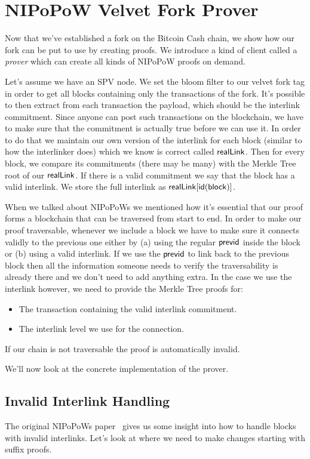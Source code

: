 \chapter{NIPoPoW Velvet Fork Prover}
Now that we've established a fork on the Bitcoin Cash chain, we show how our fork can be put to use by creating proofs. We introduce a kind of client called a \emph{prover} which can create all kinds of NIPoPoW proofs on demand.

Let's assume we have an SPV node. We set the bloom filter to our velvet fork tag in order to get all blocks containing only the transactions of the fork. It's possible to then extract from each transaction the payload, which should be the interlink commitment. Since anyone can post such transactions on the blockchain, we have to make sure that the commitment is actually true before we can use it. In order to do that we maintain our own version of the interlink for each block (similar to how the interlinker does) which we know is correct called $\sf realLink$. Then for every block, we compare its commitments (there may be many) with the Merkle Tree root of our $\sf realLink$. If there is a valid commitment we say that the block has a valid interlink. We store the full interlink as $\sf realLink[id(block)]$.

When we talked about NIPoPoWs we mentioned how it's essential that our proof forms a blockchain that can be traversed from start to end. In order to make our proof traversable, whenever we include a block we have to make sure it connects validly to the previous one either by (a) using the regular $\sf previd$ inside the block or (b) using a valid interlink. If we use the $\sf previd$ to link back to the previous block then all the information someone needs to verify the traversability is already there and we don't need to add anything extra. In the case we use the interlink however, we need to provide the Merkle Tree proofs for:

\begin{itemize}
  \item The transaction containing the valid interlink commitment.
  \item The interlink level we use for the connection.
\end{itemize}

If our chain is not traversable the proof is automatically invalid.

We'll now look at the concrete implementation of the prover.

\section{Invalid Interlink Handling}
The original NIPoPoWs paper~\cite{nipopows} gives us some insight into how to handle blocks with invalid interlinks. Let's look at where we need to make changes starting with suffix proofs.

